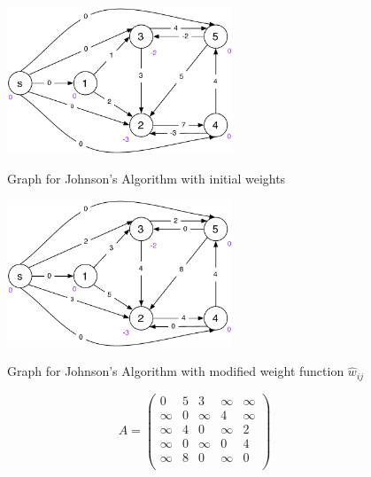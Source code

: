 \documentclass[a4paper, 12pt]{article}
\begin{document}
\begin{figure}[htbp]
    \caption{Graph for Johnson's Algorithm with initial weights}
    \vskip 0.2cm
    \centering
    \includegraphics[width=0.6\textwidth]{Figures/Exercise_10_Initial}
    \label{figure:Exercise_10_Initial}
\end{figure}

\begin{figure}[htbp]
    \caption{
        Graph for Johnson's Algorithm with modified weight function
        $\hat{w}_{ij}$
    }
    \vskip 0.2cm
    \centering
    \includegraphics[width=0.6\textwidth]{Figures/Exercise_10_Modified_Weights}
    \label{figure:Exercise_10_Modified_Weights}
\end{figure}

\[
A =
\left(
    \begin{array}{cccccc}
       0   &   5   &   3   &   ∞   &  ∞    \\
       ∞   &   0   &   ∞   &   4   &  ∞    \\
       ∞   &   4   &   0   &   ∞   &  2    \\
       ∞   &   0   &   ∞   &   0   &  4    \\
       ∞   &   8   &   0   &   ∞   &  0    \\
    \end{array}
\right)
\]


\end{document}
